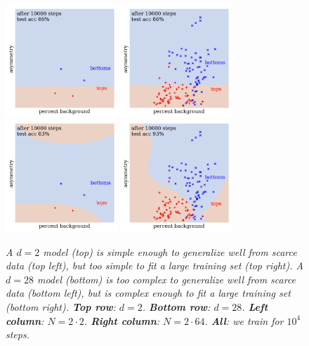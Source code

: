\documentclass[openany, notitlepage, justified]{tufte-book}
\begin{document}
            \begin{figure}[h]
                \centering
                \includegraphics[height=4.2cm]{yo-02-0002-hard-10000}
                \includegraphics[height=4.2cm]{yo-02-0064-hard-10000} \\
                \includegraphics[height=4.2cm]{yo-28-0002-hard-10000}
                \includegraphics[height=4.2cm]{yo-28-0064-hard-10000}
                \caption{\emph{
                    A $d=2$ model (top) is simple enough to generalize well
                    from scarce data (top left), but too simple to fit a large
                    training set (top right).  
                    A $d=28$ model (bottom) is too complex to generalize well
                    from scarce data (bottom left), but is complex enough to
                    fit a large training set (bottom right).
                    \textbf{Top row}: $d=2$.
                    \textbf{Bottom row}: $d=28$.
                    \textbf{Left column}: $N=2\cdot 2$.
                    \textbf{Right column}: $N=2\cdot 64$.
                    \textbf{All}: we train for $10^4$ steps.
                }}
            \end{figure}
\end{document}
